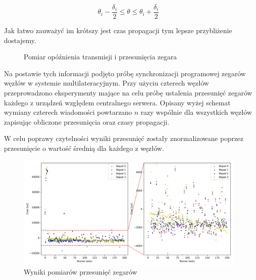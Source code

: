 \[\theta_i - \frac{\delta_i}{2} \leqslant \theta \leqslant \theta_i + \frac{\delta_i}{2}\]

Jak łatwo zauważyć im krótszy jest czas propagacji tym lepsze przybliżenie dostajemy.

\begin{figure}[H]
\centering
{}%
\caption{Pomiar opóźnienia transmisji i przesunięcia zegara}
\label{fig:ntp}
\end{figure}

Na postawie tych informacji podjęto próbę synchronizacji programowej zegarów węzłów w systemie multilateracyjnym. Przy użyciu czterech węzłów przeprowadzono eksperymenty mające na celu próbę ustalenia przesunięć zegarów każdego z urządzeń względem centralnego serwera. Opisany wyżej schemat wymiany czterech wiadomości powtarzano $n$ razy wspólnie dla wszystkich węzłów zapisując obliczone przesunięcia oraz czasy propagacji.

W celu poprawy czytelności wyniki przesunięć zostały znormalizowane poprzez przesunięcie o wartość średnią dla każdego z węzłów.

\begin{figure}[H]
\centering
    \includegraphics[width=\textwidth]{pics/ntp_sync/offsets.png}
\caption{Wyniki pomiarów przesunięć zegarów}
\label{pic:offsets_ntp}
\end{figure}

